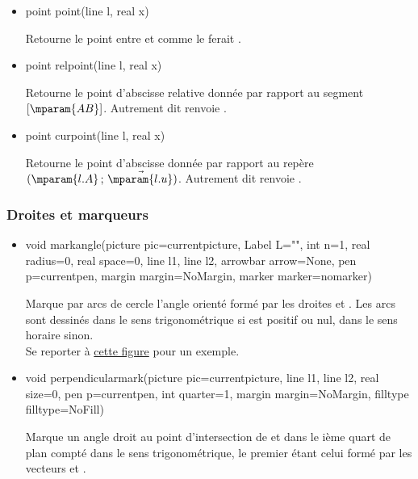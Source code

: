 \documentclass[pdftex]{article}
\begin{document}
\begin{itemize}%
\item {}%
    \begin{Vcolor}
    point point(line l, real x)
  \end{Vcolor}
  Retourne le point entre  et  comme le
  ferait .
\item {}%
    \begin{Vcolor}
    point relpoint(line l, real x)
  \end{Vcolor}
  Retourne le point d'abscisse relative  donnée par rapport au
  segment $[\mparam{AB}]$. Autrement dit  renvoie .

\item {}%
    \begin{Vcolor}
    point curpoint(line l, real x)
  \end{Vcolor}
  Retourne le point d'abscisse  donnée par rapport au
  repère $(\mparam{l.A}\,;\,\vec{\mparam{l.u}})$. Autrement dit  renvoie .

\end{itemize}

\subsubsection{Droites et marqueurs}
\begin{itemize}
\item {}%
    \begin{Vcolor}
    void markangle(picture pic=currentpicture,
    Label L="", int n=1, real radius=0, real space=0,
    line l1, line l2,
    arrowbar arrow=None, pen p=currentpen,
    margin margin=NoMargin, marker marker=nomarker)
  \end{Vcolor}
  Marque par  arcs de cercle l'angle orienté formé par les
  \og{}droites\fg{}  et . Les arcs sont dessinés
  dans le sens trigonométrique si  est positif ou nul,
  dans le sens horaire sinon.\\
  Se reporter à \og{}\href{#bisectorline}{cette figure}\fg{} pour un exemple.
\item {}%
    \begin{Vcolor}
    void perpendicularmark(picture pic=currentpicture, line l1, line l2,
    real size=0, pen p=currentpen, int quarter=1,
    margin margin=NoMargin, filltype filltype=NoFill)
  \end{Vcolor}
  Marque un angle droit au point d'intersection de 
  et  dans le ième quart de plan compté dans
  le sens trigonométrique, le premier étant celui formé par les
  vecteurs  et .

\end{itemize}
\end{document}
